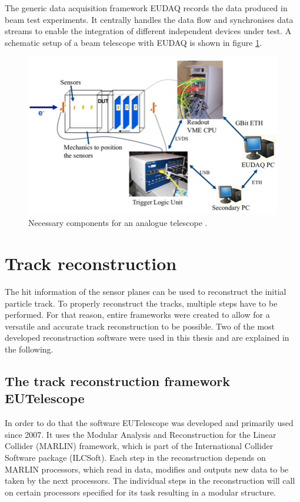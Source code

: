 The generic data acquisition framework EUDAQ \cite{eudaq} records the data produced in beam test experiments. It centrally handles the data flow and synchronises data streams to enable
the integration of different independent devices under test. A schematic setup of a beam telescope with EUDAQ is shown in figure \ref{fig:eudaq_bild}.

\begin{figure}
  \centering
  \includegraphics[height=0.4\textwidth]{images/eudaq_2.png}
  \caption{Necessary components for an analogue telescope \cite{eudaq_bild_2}.}
  \label{fig:eudaq_bild}
\end{figure}

\chapter{Track reconstruction}
The hit information of the sensor planes can be used to reconstruct the initial particle track. To properly reconstruct the tracks, multiple steps have to
be performed. For that reason, entire frameworks were created to allow for a versatile and accurate track reconstruction to be possible. Two of the most
developed reconstruction software were used in this thesis and are explained in the following.

\section{The track reconstruction framework EUTelescope}
In order to do that the software EUTelescope was developed and
primarily used since 2007. It uses the Modular Analysis and Reconstruction for the Linear Collider (MARLIN) framework, which is part of the
International Collider Software package (ILCSoft). Each step in the reconstruction depends on MARLIN processors, which read in data, modifies and outputs new data to be
taken by the next processors. The individual steps in the reconstruction will call on certain processors specified for its task resulting in a
modular structure.

